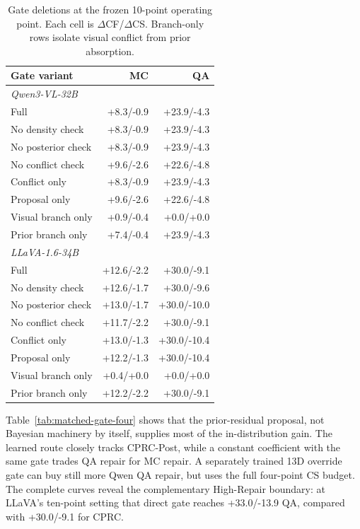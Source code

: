 \documentclass[letterpaper]{article}
\begin{document}
\begin{table}[t]
\centering
\small
\setlength{\tabcolsep}{3.0pt}
\begin{tabular}{lrr}
\toprule
Gate variant & MC & QA \\
\midrule
\multicolumn{3}{l}{\itshape Qwen3-VL-32B} \\
Full & +8.3/-0.9 & +23.9/-4.3 \\
No density check & +8.3/-0.9 & +23.9/-4.3 \\
No posterior check & +8.3/-0.9 & +23.9/-4.3 \\
No conflict check & +9.6/-2.6 & +22.6/-4.8 \\
Conflict only & +8.3/-0.9 & +23.9/-4.3 \\
Proposal only & +9.6/-2.6 & +22.6/-4.8 \\
Visual branch only & +0.9/-0.4 & +0.0/+0.0 \\
Prior branch only & +7.4/-0.4 & +23.9/-4.3 \\
\midrule
\multicolumn{3}{l}{\itshape LLaVA-1.6-34B} \\
Full & +12.6/-2.2 & +30.0/-9.1 \\
No density check & +12.6/-1.7 & +30.0/-9.6 \\
No posterior check & +13.0/-1.7 & +30.0/-10.0 \\
No conflict check & +11.7/-2.2 & +30.0/-9.1 \\
Conflict only & +13.0/-1.3 & +30.0/-10.4 \\
Proposal only & +12.2/-1.3 & +30.0/-10.4 \\
Visual branch only & +0.4/+0.0 & +0.0/+0.0 \\
Prior branch only & +12.2/-2.2 & +30.0/-9.1 \\
\bottomrule
\end{tabular}
\caption{Gate deletions at the frozen 10-point operating point. Each cell is
$\Delta$CF/$\Delta$CS. Branch-only rows isolate visual conflict from prior
absorption.}
\label{tab:gate-deletions}
\end{table}

Table~\ref{tab:matched-gate-four} shows that the prior-residual proposal, not
Bayesian machinery by itself, supplies most of the in-distribution gain.
The learned route closely tracks CPRC-Post, while a constant coefficient
with the same gate trades QA repair for MC repair. A separately trained 13D
override gate can buy still more Qwen QA repair, but uses the full four-point CS
budget. The complete curves reveal the complementary High-Repair boundary: at
LLaVA's ten-point setting that direct gate reaches +33.0/-13.9 QA, compared with
+30.0/-9.1 for CPRC.
\end{document}
